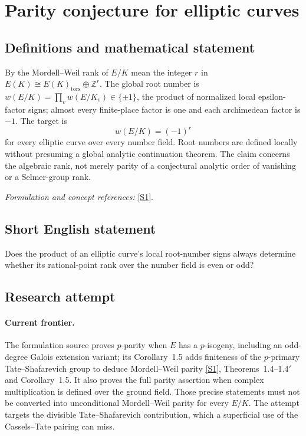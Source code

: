 \documentclass[11pt,a4paper]{article}
\newcommand{\Z}{\mathbb{Z}}
\newcommand{\sref}[2]{\hyperlink{source:#1:#2}{[S#2]}}
\newif\ifshowcatalogue
\newcommand{\cataloguescope}[1]{\ifshowcatalogue
 \paragraph{Exact scope in the supplied catalogue.}
 \begin{quote}\small #1\end{quote}\fi}
\numberwithin{equation}{section}
\begin{document}
\setcounter{section}{0}
\clearpage
\section*{\texorpdfstring{Parity conjecture for elliptic curves}{Parity conjecture for elliptic curves}}\label{30006786}
\subsection{Definitions and mathematical statement}
By the Mordell--Weil rank of $E/K$ mean the integer $r$ in
$E(K)\cong E(K)_{\mathrm{tors}}\oplus\Z^r$. The global root number is
$w(E/K)=\prod_v w(E/K_v)\in\{\pm1\}$, the product of normalized local epsilon-factor signs; almost every finite-place factor is one and each archimedean factor is $-1$. The target is
\[
 w(E/K)=(-1)^r
\]
for every elliptic curve over every number field. Root numbers are defined locally without presuming a global analytic continuation theorem. The claim concerns the algebraic rank, not merely parity of a conjectural analytic order of vanishing or a Selmer-group rank.
\par\smallskip\textit{Formulation and concept references:} \sref{30006786}{1}.
\cataloguescope{For every number field K and every elliptic curve E/K, is w(E/K)=(-1)\textasciicircum{}rank\_Z E(K), where rank\_Z E(K) is the Mordell-Weil rank and w(E/K)=product\_v w(E/K\_v) is the global root number? The local factors are the usual Weil-Deligne root numbers at finite places, equal to1 at all but finitely many places, and -1 at every archimedean place; their definition does not assume analytic continuation of L(E/K,s).}
\subsection{Short English statement}
Does the product of an elliptic curve's local root-number signs always determine whether its rational-point rank over the number field is even or odd?
\subsection{Research attempt}

\paragraph{Current frontier.}
The formulation source proves $p$-parity when $E$ has a $p$-isogeny, including an odd-degree Galois extension variant; its Corollary~1.5 adds finiteness of the $p$-primary Tate--Shafarevich group to deduce Mordell--Weil parity \sref{30006786}{1}, Theorems~1.4--1.4$'$ and Corollary~1.5. It also proves the full parity assertion when complex multiplication is defined over the ground field. Those precise statements must not be converted into unconditional Mordell--Weil parity for every $E/K$. The attempt targets the divisible Tate--Shafarevich contribution, which a superficial use of the Cassels--Tate pairing can miss.
\end{document}
